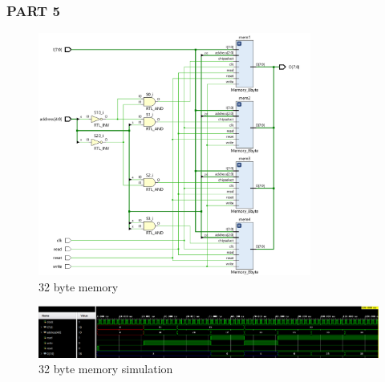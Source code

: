 \documentclass[pdftex,12pt,a4paper]{article}
\begin{document}
\hypertarget{hype5}{}
\subsubsection{PART 5}

\begin{figure}[H]
    	\centering
    	\includegraphics[width=0.8\textwidth]{schematic/part5_design.png}	
    	\caption{32 byte memory}
    	\label{32 byte memory}
    \end{figure}
    
    \begin{figure}[H]
    	\centering
    	\includegraphics[width=1\textwidth]{simulations/part5_result.png}	
    	\caption{32 byte memory simulation}
    	\label{32 byte memory simulation}
    \end{figure}



\hypertarget{hype6}{}
\end{document}
